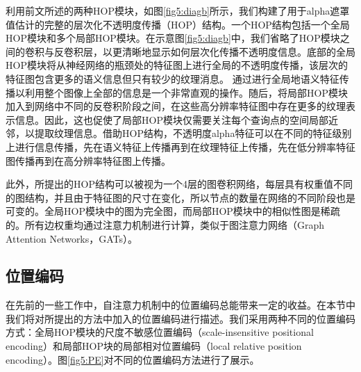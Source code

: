 利用前文所述的两种HOP模块，如图\ref{fig5:diagb}所示，我们构建了用于alpha遮罩值估计的完整的层次化不透明度传播（HOP）结构。一个HOP结构包括一个全局HOP模块和多个局部HOP模块。在示意图\ref{fig5:diagb}中，我们省略了HOP模块之间的卷积与反卷积层，以更清晰地显示如何层次化传播不透明度信息。底部的全局HOP模块将从神经网络的瓶颈处的特征图上进行全局的不透明度传播，该层次的特征图包含更多的语义信息但只有较少的纹理消息。
通过进行全局地语义特征传播以利用整个图像上全部的信息是一个非常直观的操作。随后，将局部HOP模块加入到网络中不同的反卷积阶段之间，在这些高分辨率特征图中存在更多的纹理表示信息。因此，这也促使了局部HOP模块仅需要关注每个查询点的空间局部近邻，以提取纹理信息。借助HOP结构，不透明度alpha特征可以在不同的特征级别上进行信息传播，先在语义特征上传播再到在纹理特征上传播，先在低分辨率特征图传播再到在高分辨率特征图上传播。

此外，所提出的HOP结构可以被视为一个4层的图卷积网络\cite{kipf2016semi}，每层具有权重值不同的图结构，并且由于特征图的尺寸在变化，所以节点的数量在网络的不同阶段也是可变的。全局HOP模块中的图为完全图，而局部HOP模块中的相似性图是稀疏的。所有边权重均通过注意力机制进行计算，类似于图注意力网络（Graph Attention Networks，GATs）\cite{velivckovic2017graph}。

\subsection{位置编码}
在先前的一些工作中，自注意力机制中的位置编码总能带来一定的收益\cite{vaswani2017attention,dai2019transformer,ramachandran2019stand}。在本节中我们将对所提出的方法中加入的位置编码进行描述。我们采用两种不同的位置编码方式：全局HOP模块的尺度不敏感位置编码（scale-insensitive positional encoding）和局部HOP块的局部相对位置编码（local relative position encoding）。图\ref{fig5:PE}对不同的位置编码方法进行了展示。

